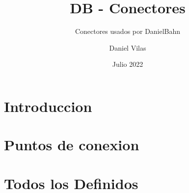 \documentclass[spanish]{DccDiyTools/DccDiyTools}
\title{DB - Conectores}
\subtitle{Conectores usados por DanielBahn}
\author{Daniel Vilas}
\date{Julio 2022}
\begin{document}
\maketitle
\newpage
\section{Introduccion}

\newpage
\section{Puntos de conexion}



\newpage
\section{Todos los Definidos}

\end{document}
